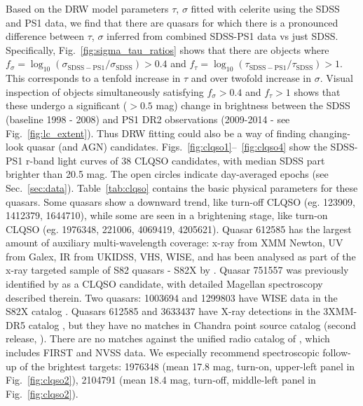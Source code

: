\documentclass[twocolumn]{aastex62}
\newcommand{\project}[1]{\textsf{#1}}
\begin{document}
Based on the DRW model  parameters $\tau$, $\sigma$ fitted with \project{celerite} using the SDSS and PS1 data, we find that there are quasars for which there is a pronounced difference between $\tau$, $\sigma$  inferred from combined SDSS-PS1 data vs just SDSS. Specifically, Fig.~\ref{fig:sigma_tau_ratios} shows that there are objects where 
$f_{\sigma} = \log_{10}{\left( \sigma_{\mathrm{SDSS-PS1}} / \sigma_{\mathrm{SDSS}} \right)} > 0.4 $ and 
 $f_{\tau} = \log_{10}{\left( \tau_{\mathrm{SDSS-PS1}} / \tau_{\mathrm{SDSS}} \right)} > 1  $.  This corresponds to a tenfold increase in $\tau$ and over twofold increase in $\sigma$. Visual inspection of objects simultaneously satisfying $f_{\sigma}> 0.4$ and $f_{\tau}> 1 $ shows that these undergo a significant ($>0.5$ mag) change in brightness between the SDSS (baseline 1998 - 2008) and PS1 DR2 observations (2009-2014 - see Fig.~\ref{fig:lc_extent}). Thus DRW fitting could also be a way of finding changing-look quasar (and AGN) candidates. Figs.~\ref{fig:clqso1}--~\ref{fig:clqso4} show the SDSS-PS1 r-band light curves of 38 CLQSO candidates, with median SDSS part brighter than 20.5 mag. The open circles indicate day-averaged epochs (see Sec.~\ref{sec:data}). Table~\ref{tab:clqso} contains the basic physical parameters for these quasars. Some quasars show a downward trend, like turn-off CLQSO (eg. 123909, 1412379,  1644710), while some are seen in a brightening stage, like turn-on CLQSO (eg. 1976348, 221006, 4069419, 4205621). Quasar 612585 has the largest amount of auxiliary multi-wavelength coverage: x-ray from XMM Newton, UV from Galex, IR from UKIDSS, VHS, WISE, and has been analysed as part of the x-ray targeted sample of S82 quasars - S82X by \cite{lamassa2016a}. Quasar 751557 was previously identified by \cite{macleod2019} as a CLQSO candidate, with detailed Magellan spectroscopy described therein.  Two quasars: 1003694 and 1299803 have WISE data in the S82X catalog \citep{lamassa2016a}. Quasars 612585 and 3633437 have X-ray detections in the 3XMM-DR5 catalog \citep{rosen2016}, but they have no matches in Chandra point source catalog (second release, \citealt{evans2010, evans2018}). There are no matches against the unified radio catalog of \cite{kimball2008}, which includes FIRST and NVSS data. We especially recommend spectroscopic follow-up of the brightest targets: 1976348 (mean 17.8 mag, turn-on, upper-left panel in Fig.~\ref{fig:clqso2}), 2104791 (mean 18.4 mag, turn-off, middle-left panel in Fig.~\ref{fig:clqso2}). 

\begin{figure*} %
\caption{Outliers in the space of recovered DRW parameters between SDSS and SDSS-PS1, as well as median offsets. Page 1.}
\label{fig:clqso1}
\end{figure*}
\end{document}
